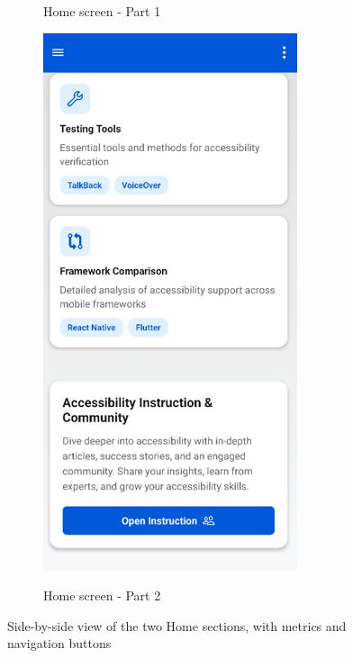 \begin{figure}[ht]
\begin{subfigure}[b]{0.44\textwidth}
        \caption{Home screen - Part 1}
        \label{fig:home-left}
    \end{subfigure}
    \hfill
    \begin{subfigure}[b]{0.48\textwidth}
        \centering
        \includegraphics[width=\linewidth, alt={Second part of the Home screen}]{img/home2.png}
        \caption{Home screen - Part 2}
        \label{fig:home-right}
    \end{subfigure}
    \caption{Side-by-side view of the two Home sections, with metrics and navigation buttons}
    \label{fig:home_screens_sidebyside}
\end{figure}

